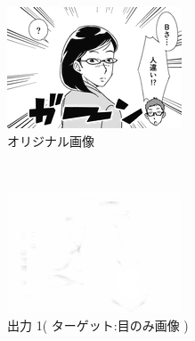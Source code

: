 \documentclass[onecolumn]{ujarticle}     %
\begin{document}
	\begin{figure}[h]
		\vspace{-4mm}
		\centering
		\begin{subfigure}{0.49\columnwidth}
			\centering
			\includegraphics[width=1.2\columnwidth]{original.png}
			\caption{オリジナル画像}
			\label{fig:original}
		\end{subfigure}
		\\
		\begin{subfigure}{0.49\columnwidth}
			\centering
			\includegraphics[width=1.2\columnwidth]{eyes_only_10.png}
			\caption{出力 1( ターゲット:目のみ画像 )}
			\label{fig:only_eye}
		\end{subfigure}
		\begin{subfigure}{0.49\columnwidth}
			\centering

\end{subfigure}
\end{figure}
\end{document}
